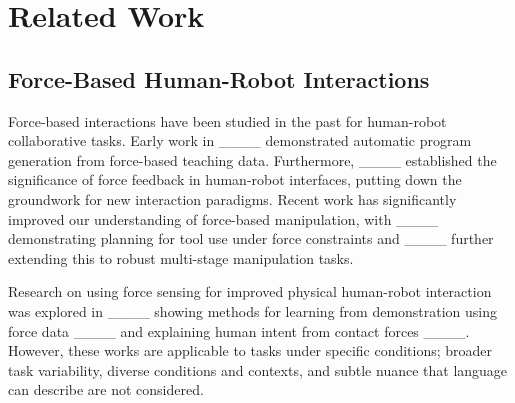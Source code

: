 \section{Related Work}
\label{sec:Related Work}


\subsection{Force-Based Human-Robot Interactions}

Force-based interactions have been studied in the past for human-robot collaborative tasks.
Early work in ____  demonstrated automatic program generation from force-based teaching data. Furthermore, ____ established the significance of force feedback in human-robot interfaces, putting down the groundwork for new interaction paradigms. Recent work has significantly improved our understanding of force-based manipulation, with ____ demonstrating planning for tool use under force constraints and ____ further extending this to robust multi-stage manipulation tasks.

Research on using force sensing for improved physical human-robot interaction was explored in ____  showing methods for learning from demonstration using force data ____ and explaining human intent from contact forces ____. However, these works are applicable to tasks under specific conditions; broader task variability, diverse conditions and contexts, and subtle nuance that language can describe are not considered. %


